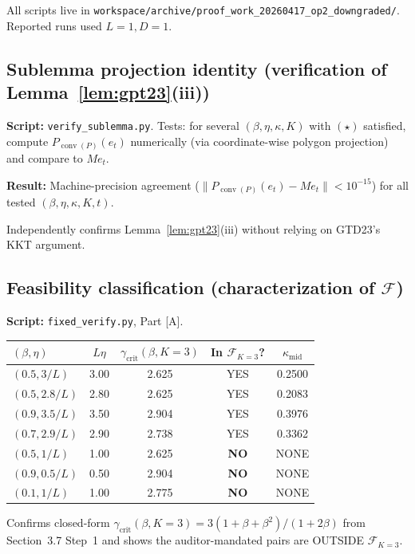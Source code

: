 \documentclass[11pt]{article}
\theoremstyle{definition}
\theoremstyle{remark}
\DeclareMathOperator{\conv}{conv}
\begin{document}
All scripts live in \texttt{workspace/archive/proof\_work\_20260417\_op2\_downgraded/}. Reported runs used $L = 1, D = 1$.

\subsection{Sublemma projection identity (verification of Lemma~\ref{lem:gpt23}(iii))}

\textbf{Script:} \texttt{verify\_sublemma.py}. Tests: for several $(\beta, \eta, \kappa, K)$ with $(\star)$ satisfied, compute $P_{\conv(P)}(e_t)$ numerically (via coordinate-wise polygon projection) and compare to $M e_t$.

\textbf{Result:} Machine-precision agreement ($\|P_{\conv(P)}(e_t) - M e_t\| < 10^{-15}$) for all tested $(\beta,\eta,\kappa,K,t)$.

Independently confirms Lemma~\ref{lem:gpt23}(iii) without relying on GTD23's KKT argument.

\subsection{Feasibility classification (characterization of \texorpdfstring{$\mathcal{F}$}{F})}

\textbf{Script:} \texttt{fixed\_verify.py}, Part [A].

\begin{center}
\small
\begin{tabular}{lcccc}
\toprule
$(\beta, \eta)$ & $L\eta$ & $\gamma_{\mathrm{crit}}(\beta, K{=}3)$ & In $\mathcal{F}_{K=3}$? & $\kappa_{\mathrm{mid}}$ \\
\midrule
$(0.5, 3/L)$       & 3.00 & 2.625 & YES & 0.2500 \\
$(0.5, 2.8/L)$     & 2.80 & 2.625 & YES & 0.2083 \\
$(0.9, 3.5/L)$     & 3.50 & 2.904 & YES & 0.3976 \\
$(0.7, 2.9/L)$     & 2.90 & 2.738 & YES & 0.3362 \\
$(0.5, 1/L)$       & 1.00 & 2.625 & \textbf{NO}  & NONE \\
$(0.9, 0.5/L)$     & 0.50 & 2.904 & \textbf{NO}  & NONE \\
$(0.1, 1/L)$       & 1.00 & 2.775 & \textbf{NO}  & NONE \\
\bottomrule
\end{tabular}
\end{center}

Confirms closed-form $\gamma_{\mathrm{crit}}(\beta, K=3) = 3(1+\beta+\beta^2)/(1+2\beta)$ from Section~3.7 Step~1 and shows the auditor-mandated pairs are OUTSIDE $\mathcal{F}_{K=3}$.
\end{document}
